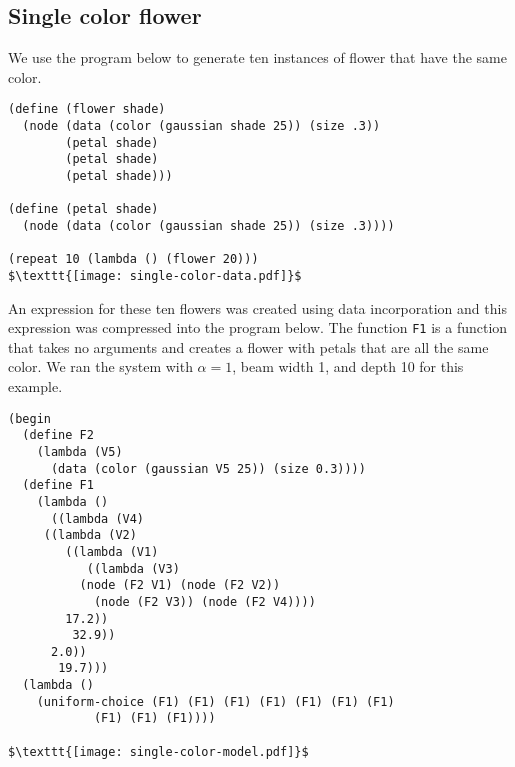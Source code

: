 \documentclass[a4paper,10pt]{article}
\begin{document}
\subsection{Single color flower}
We use the program below to generate ten instances of flower that have the same color.  
\begin{lstlisting}[mathescape=true]
(define (flower shade)
  (node (data (color (gaussian shade 25)) (size .3))
        (petal shade)
        (petal shade)
        (petal shade)))

(define (petal shade)
  (node (data (color (gaussian shade 25)) (size .3))))

(repeat 10 (lambda () (flower 20)))
$\texttt{[image: single-color-data.pdf]}$
\end{lstlisting}
An expression for these ten flowers was created using data incorporation and this expression was compressed into the program below.  The function \texttt{F1} is a function that takes no arguments and creates a flower with petals that are all the same color.  We ran the system with $\alpha=1$, beam width 1, and depth 10 for this example.
\begin{lstlisting}[mathescape=true]
(begin
  (define F2
    (lambda (V5)
      (data (color (gaussian V5 25)) (size 0.3))))
  (define F1
    (lambda ()
      ((lambda (V4)
	 ((lambda (V2)
	    ((lambda (V1)
	       ((lambda (V3)
		  (node (F2 V1) (node (F2 V2))
			(node (F2 V3)) (node (F2 V4))))
		17.2))
	     32.9))
	  2.0))
       19.7)))
  (lambda ()
    (uniform-choice (F1) (F1) (F1) (F1) (F1) (F1) (F1)
		    (F1) (F1) (F1))))

$\texttt{[image: single-color-model.pdf]}$
\end{lstlisting}
\end{document}
